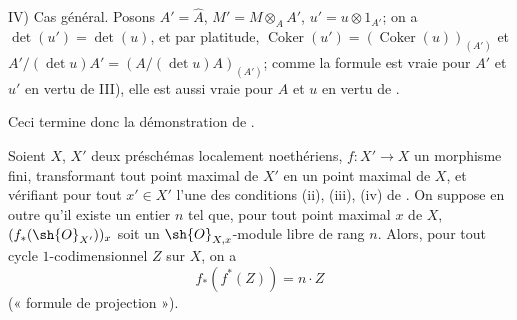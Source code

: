 IV) Cas général.
Posons $A'=\widehat{A}$, $M'=M\otimes_AA'$, $u'=u\otimes1_{A'}$;
on a $\det(u')=\det(u)$, et par platitude, $\operatorname{Coker}(u')=(\operatorname{Coker}(u))_{(A')}$ et $A'/(\det u)A'=(A/(\det u)A)_{(A')}$;
comme la formule  est vraie pour $A'$ et $u'$ en vertu de III), elle est aussi vraie pour $A$ et $u$ en vertu de .

Ceci termine donc la démonstration de .

\begin{proposition}[21.10.18]
\label{IV.21.10.18}
Soient $X$, $X'$ deux préschémas localement noethériens, $f:X'\to X$ un morphisme fini, transformant tout point maximal de $X'$ en un point maximal de $X$, et vérifiant pour tout $x'\in X'$ l'une des conditions (ii), (iii), (iv) de .
On suppose en outre qu'il existe un entier $n$ tel que, pour tout point maximal $x$ de $X$, $(f_*(\sh{O}_{X'}))_x$ soit un $\sh{O}_{X,x}$-module libre de rang $n$.
Alors, pour tout cycle $1$-codimensionnel $Z$ sur $X$, on a
\[
\label{IV.21.10.18.1}
  f_*(f^*(Z))=n\cdot Z
  \tag{21.10.18.1}
\]
(« formule de projection »).
\end{proposition}

